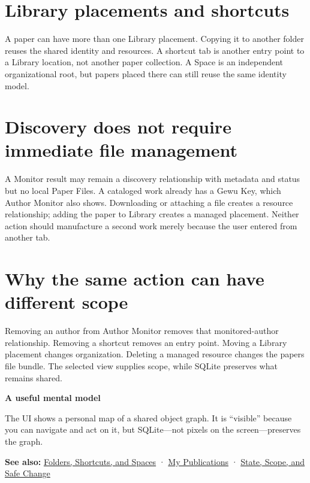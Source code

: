 \documentclass[10pt,letterpaper,oneside]{scrreprt}
\newenvironment{GewuRelated}{\par\nobreak\vspace{3pt}\nobreak\begingroup\small\sffamily\begin{samepage}\noindent}{\par\end{samepage}\endgroup}
\renewenvironment{quote}
  {\Needspace{5\baselineskip}\begin{tcolorbox}[enhanced,breakable,colback=GewuPale,colframe=GewuPale,boxrule=0pt,
    borderline west={1.6pt}{0pt}{GewuBlue},arc=1.2mm,left=2.5mm,right=2.5mm,top=1.7mm,bottom=1.7mm,
    before skip=4pt,after skip=5pt,fontupper=\color{GewuInk}\small]}
  {\end{tcolorbox}}
\begin{document}
\section{Library placements and shortcuts}\label{library-placements-and-shortcuts}

A paper can have more than one Library placement. Copying it to another folder reuses the shared identity and resources. A shortcut tab is another entry point to a Library location, not another paper collection. A Space is an independent organizational root, but papers placed there can still reuse the same identity model.

\section{Discovery does not require immediate file management}\label{discovery-does-not-require-immediate-file-management}

A Monitor result may remain a discovery relationship with metadata and status but no local Paper Files. A cataloged work already has a Gewu Key, which Author Monitor also shows. Downloading or attaching a file creates a resource relationship; adding the paper to Library creates a managed placement. Neither action should manufacture a second work merely because the user entered from another tab.

\section{Why the same action can have different scope}\label{why-the-same-action-can-have-different-scope}

Removing an author from Author Monitor removes that monitored-author relationship. Removing a shortcut removes an entry point. Moving a Library placement changes organization. Deleting a managed resource changes the paper\textquotesingle s file bundle. The selected view supplies scope, while SQLite preserves what remains shared.

\begin{quote}
\textbf{A useful mental model}

The UI shows a personal map of a shared object graph. It is ``visible'' because you can navigate and act on it, but SQLite---not pixels on the screen---preserves the graph.
\end{quote}

\begin{GewuRelated}
\textbf{See also:} \hyperref[organize]{Folders, Shortcuts, and Spaces} · \hyperref[my-publications]{My Publications} · \hyperref[state-and-scope]{State, Scope, and Safe Change}
\end{GewuRelated}
\end{document}
